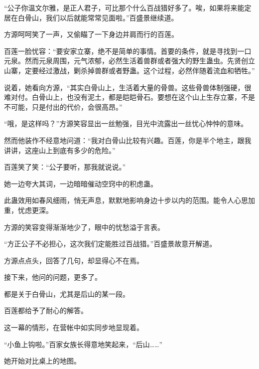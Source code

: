 \begin{this_body}
“公子你温文尔雅，是正人君子，可比那个什么百战猎好多了。唉，如果将来能定居在白骨山，我们以后就能常常见面啦。”百盛景继续道。

方源呵呵笑了一声，又偷瞄了一下身边并肩而行的百莲。

百莲一脸忧容：“要安家立寨，绝不是简单的事情。首要的条件，就是寻找到一口元泉。然而元泉周围，元气浓郁，必然生活着兽群或者强大的野生蛊虫。先贤创立山寨，定要经过激战，剿杀掉兽群或者野蛊。这个过程，必然伴随着流血和牺牲。”

说着，她看向方源，“其实白骨山上，生活着大量的骨兽。这些骨兽体制强硬，很难对付。白骨山上，也没有泥土，都是皑皑骨石。要想在这个山上生存立寨，不是不可能，只是付出的代价，会很高昂。”

“哦，是这样吗？”方源笑容显出一丝勉强，目光中流露出一丝忧心忡忡的意味。

然而他装作不经意地问道：“我对白骨山比较有兴趣。百莲，你是半个地主，跟我讲讲，这座山上到底有多少的危险。”

百莲笑了笑：“公子要听，那我就说说。”

她一边夸大其词，一边暗暗催动空窍中的积虑蛊。

此蛊效用如春风细雨，悄无声息，默默地影响身边十步以内的范围。能令人心思加重，忧虑更深。

方源的笑容变得渐渐地少了，眼中的忧愁溢于言表。

“方正公子不必担心，这次我们定能胜过百战猎。”百盛景故意开解道。

方源点点头，回答了几句，却显得心不在焉。

接下来，他问的问题，更多了。

都是关于白骨山，尤其是后山的某一段。

百莲都给予了耐心的解答。

这一幕的情形，在营帐中如实同步地显现着。

“小鱼上钩啦。”百家女族长得意地笑起来，“后山……”

她开始对比桌上的地图。

\end{this_body}

